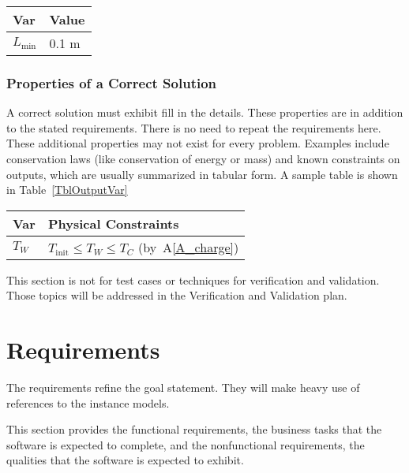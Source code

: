 \documentclass[12pt]{article}
\newcommand{\aref}[1]{A\ref{#1}}
\begin{document}
\begin{table}[!h]
\caption{Specification Parameter Values} \label{TblSpecParams}
\renewcommand{\arraystretch}{1.2}
\noindent \begin{longtable*}{l l} 
  \toprule
  \textbf{Var} & \textbf{Value} \\
  \midrule 
  $L_\text{min}$ & 0.1 \si{\metre}\\
  \bottomrule
\end{longtable*}
\end{table}

\subsubsection{Properties of a Correct Solution} \label{sec_CorrectSolution}

A correct solution must exhibit fill in the details.  These properties are in
addition to the stated requirements.  There is no need to repeat the
requirements here.  These additional properties may not exist for every problem.
Examples include conservation laws (like conservation of energy or mass) and
known constraints on outputs, which are usually summarized in tabular form.  A
sample table is shown in Table~\ref{TblOutputVar}

\begin{table}[!h]
\caption{Output Variables} \label{TblOutputVar}
\renewcommand{\arraystretch}{1.2}
\noindent \begin{longtable*}{l l} 
  \toprule
  \textbf{Var} & \textbf{Physical Constraints} \\
  \midrule 
  $T_W$ & $T_\text{init} \leq T_W \leq T_C$ (by~\aref{A_charge})
  \\
  \bottomrule
\end{longtable*}
\end{table}

This section is not for test cases or techniques for verification and
validation.  Those topics will be addressed in the Verification and Validation
plan.

\section{Requirements}

The requirements refine the goal statement.  They will make heavy use of
references to the instance models.

This section provides the functional requirements, the business tasks that the
software is expected to complete, and the nonfunctional requirements, the
qualities that the software is expected to exhibit.
\end{document}

